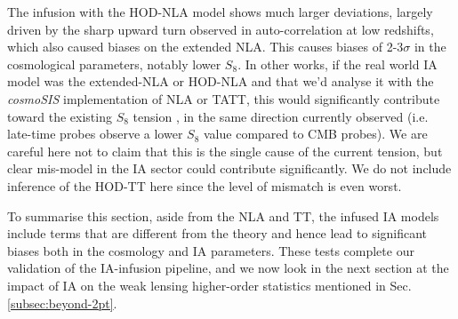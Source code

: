 The infusion with the HOD-NLA model shows much larger deviations, largely driven by the sharp upward turn observed in auto-correlation at low redshifts, which also caused biases on the extended NLA. This causes biases of 2-3$\sigma$ in the cosmological parameters, notably lower $S_8$. In other works, if the  real world IA model was the extended-NLA or HOD-NLA and that we'd analyse it with the {\it cosmoSIS} implementation of  NLA or TATT, this would significantly contribute toward the existing $S_8$ tension \citep{S8tension}, in the same direction currently observed (i.e. late-time probes observe a lower $S_8$ value compared to CMB probes). We are careful here not to claim that this is the single cause of the current tension, but clear mis-model in the IA sector could contribute significantly. We do not include inference of the HOD-TT here since the level of mismatch is even worst.
  
 To summarise this section, aside from the NLA and TT, the infused IA models include terms that are different from the theory and hence lead to significant biases both in the cosmology and IA parameters.  
 These tests complete our validation of the IA-infusion pipeline, and we now look in the next section at the impact of IA on the weak lensing higher-order statistics mentioned in Sec. \ref{subsec:beyond-2pt}.
 